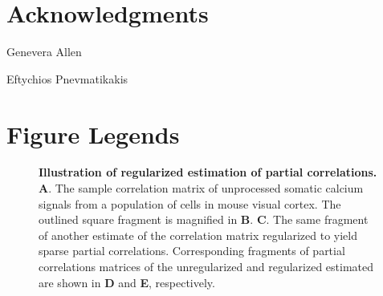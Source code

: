 \documentclass[10pt]{article}
\begin{document}
\section*{Acknowledgments}
Genevera Allen

Eftychios Pnevmatikakis 




\section*{Figure Legends}

\begin{figure}[!ht]
    \begin{center}
    \end{center}
    \caption{{\bf Illustration of regularized estimation of partial correlations.}
        {\bf A}. The sample correlation matrix of unprocessed somatic calcium signals from a population of cells in mouse visual cortex.
        The outlined square fragment is magnified in {\bf B}.
        {\bf C}. The same fragment of another estimate of the correlation matrix regularized to yield sparse partial correlations.
        Corresponding fragments of partial correlations matrices of the unregularized and regularized estimated are shown in {\bf D} and {\bf E}, respectively.
    }
    \label{fig:01}
\end{figure}
\end{document}
